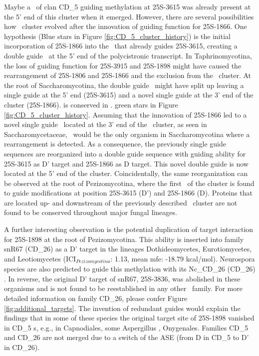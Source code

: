 Maybe a \sno\ of clan CD\_5 guiding methylation at 25S-3615 was already
present at the 5' end of this cluster when it emerged. However, there are
several possibilities how  \sno\ cluster evolved after the
innovation of guiding function for 25S-1866.  One hypothesis (Blue stars in
Figure \ref{fig:CD_5_cluster_history}) is the initial incorporation of
25S-1866 into the \sno\ that already guides 25S-3615, creating a double
guide \sno\ at the 5' end of the polycistronic transcript. In
Taphrinomycotina, the loss of guiding function for 25S-3915 and 25S-1898
might have caused the rearrangement of 25S-1806 and 25S-1866 and the
exclusion from the \sno\ cluster. At the root of Saccharomycotina, the
double guide \sno\ might have split up leaving a single guide at the 5' end
(25S-3615) and a novel single guide at the 3' end of the cluster
(25S-1866).  is conserved
 in \Yli.  green stars in
Figure \ref{fig:CD_5_cluster_history}. Assuming that the innovation of
25S-1866 led to a novel single guide \sno\ located at the 3' end of the
\sno\ cluster, as seen in Saccharomycetaceae, \yli\ would be the only
organism in Saccharomycotina where a rearrangement is detected. As a
consequence, the previously single guide sequences are reorganized into a
double guide sequence with guiding ability for 25S-3615 as D' target and
25S-1866 as D target. This novel double guide is now located at the 5' end
of the cluster.  Coincidentally, the same reorganization can be observed at the
root of Pezizomycotina, where the first \sno\ of the cluster is found to
guide modifications at position 25S-3615 (D') and 25S-1866 (D). Proteins
that are located up- and downstream of the previously described \sno\
cluster are not found to be conserved throughout major fungal lineages.

A further interesting observation is the potential duplication of target
interaction for 25S-1898 at the root of Pezizomycotina. This ability is
inserted into family snR67 (CD\_26) as a D' target in the lineages
Dothideomycetes, Eurotiomycetes, and Leotiomycetes (ICI$_{Pezizomycotina}$:
1.13, mean mfe: -18.79 kcal/mol). Neurospora species are also predicted to
guide this methylation with its Nc\_CD\_26 (CD\_26) \sno
\cite{Liu:2009}. In reverse, the original D' target of snR67, 25S-3836, was
abolished in these organisms and is not found to be reestablished in any
other \sno\ family. For more detailed information on family CD\_26, please
confer Figure \ref{fig:additional_targets}. The invention of redundant
guides would explain the findings that in some of these species the
original target site of 25S-1898 vanished in CD\_5 \sno s, e.g., in
Capnodiales, some Aspergillus \PFS{species}, \PFS{and} Onygenales. Families
CD\_5 and CD\_26 are not merged due to a switch of the ASE (from D in CD\_5
to D' in CD\_26).

